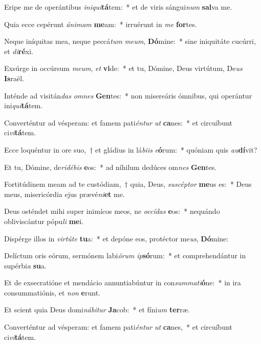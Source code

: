 \item Eripe me de operántibus \textit{in}\textit{i}\textit{qui}\textbf{tá}tem:~* et de viris sángui\textit{num} \textbf{sal}va me.
\item Quia ecce cepérunt \textit{á}\textit{ni}\textit{mam} \textbf{me}am:~* irruérunt in \textit{me} \textbf{for}tes.
\item Neque iníquitas mea, neque peccá\textit{tum} \textit{me}\textit{um}, \textbf{Dó}mine:~* sine iniquitáte cucúrri, et \textit{di}\textbf{ré}xi.
\item Exsúrge in occúrsum \textit{me}\textit{um}, \textit{et} \textbf{vi}de:~* et tu, Dómine, Deus virtútum, De\textit{us} \textbf{Is}raël.
\item Inténde ad visitán\textit{das} \textit{om}\textit{nes} \textbf{Gen}tes:~* non misereáris ómnibus, qui operántur ini\textit{qui}\textbf{tá}tem.
\item Converténtur ad vésperam: et famem pati\textit{én}\textit{tur} \textit{ut} \textbf{ca}nes:~* et circuíbunt ci\textit{vi}\textbf{tá}tem.
\item Ecce loquéntur in ore suo,~† et gládius in lá\textit{bi}\textit{is} \textit{e}\textbf{ó}rum:~* quóniam quis \textit{au}\textbf{dí}vit?
\item Et tu, Dómine, de\textit{ri}\textit{dé}\textit{bis} \textbf{e}os:~* ad níhilum dedúces om\textit{nes} \textbf{Gen}tes.
\item Fortitúdinem meam ad te custódiam,~† quia, Deus, \textit{su}\textit{scép}\textit{tor} \textbf{me}us es:~* Deus meus, misericórdia ejus prævé\textit{ni}\textbf{et} me.
\item Deus osténdet mihi super inimícos meos, ne \textit{oc}\textit{cí}\textit{das} \textbf{e}os:~* nequándo obliviscántur pópu\textit{li} \textbf{me}i.
\item Dispérge illos in \textit{vir}\textit{tú}\textit{te} \textbf{tu}a:~* et depóne eos, protéctor me\textit{us}, \textbf{Dó}mine:
\item Delíctum oris eórum, sermónem labi\textit{ó}\textit{rum} \textit{ip}\textbf{só}rum:~* et comprehendántur in supérbi\textit{a} \textbf{su}a.
\item Et de exsecratióne et mendácio annuntiabúntur in con\textit{sum}\textit{ma}\textit{ti}\textbf{ó}ne:~* in ira consummatiónis, et \textit{non} \textbf{e}runt.
\item Et scient quia Deus domi\textit{ná}\textit{bi}\textit{tur} \textbf{Ja}cob:~* et fíni\textit{um} \textbf{ter}ræ.
\item Converténtur ad vésperam: et famem pati\textit{én}\textit{tur} \textit{ut} \textbf{ca}nes,~* et circuíbunt ci\textit{vi}\textbf{tá}tem.
